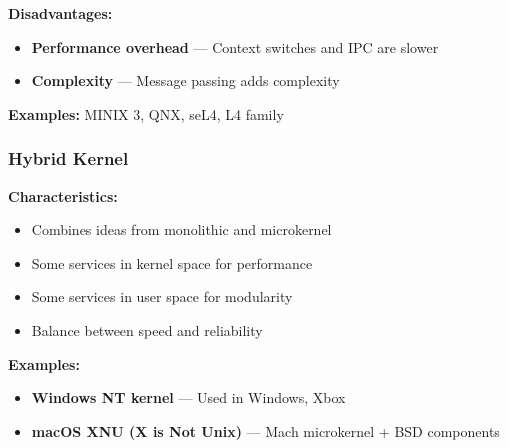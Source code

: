 \textbf{Disadvantages:}
\begin{itemize}
    \item \textbf{Performance overhead} --- Context switches and IPC are slower
    \item \textbf{Complexity} --- Message passing adds complexity
\end{itemize}

\textbf{Examples:} MINIX 3, QNX, seL4, L4 family

\subsubsection{Hybrid Kernel}

\textbf{Characteristics:}
\begin{itemize}
    \item Combines ideas from monolithic and microkernel
    \item Some services in kernel space for performance
    \item Some services in user space for modularity
    \item Balance between speed and reliability
\end{itemize}

\textbf{Examples:}
\begin{itemize}
    \item \textbf{Windows NT kernel} --- Used in Windows, Xbox
    \item \textbf{macOS XNU (X is Not Unix)} --- Mach microkernel + BSD components
\end{itemize}

